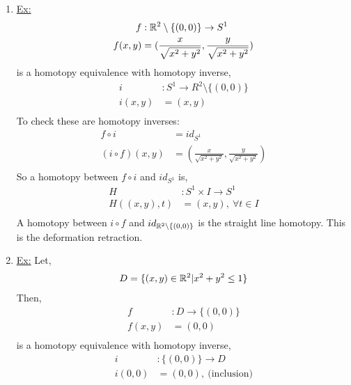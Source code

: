     \begin{enumerate}
        \item \underline{Ex:}
            \begin{align*}
                f&: \mathbb{R}^2\setminus\{(0,0)\}\rightarrow S^{1}\\
                f(x,y)&=(\frac{x}{\sqrt{x^2+y^2}},\frac{y}{\sqrt{x^2+y^2}})\\
            \end{align*}
            is a homotopy equivalence with homotopy inverse,
            \begin{align*}
                i&: S^{1}\rightarrow R^2\setminus\{(0,0)\}\\
                i(x,y)&=(x,y)\\
            \end{align*}
            To check these are homotopy inverses:
            \begin{align*}
                f\circ i &= id_{S^1}\\
                (i\circ f)(x,y)&=(\frac{x}{\sqrt{x^2+y^2}},\frac{y}{\sqrt{x^2+y^2}})\\
            \end{align*}
            So a homotopy between $f\circ i$ and $id_{S^{1}}$ is,
            \begin{align*}
                H&:S^{1}\times I\rightarrow S^{1}\\
                H((x,y),t)&=(x,y),\ \forall t\in I\\
            \end{align*}
            A homotopy between $i\circ f$ and $id_{\mathbb{R}^2\setminus\{(0,0)\}}$ is the straight line homotopy. This is
            the deformation retraction.
        \item \underline{Ex:} Let,
            \begin{align*}
                D&=\{(x,y)\in \mathbb{R}^2| x^2+y^2\leq 1\}\\
            \end{align*}
            Then,
            \begin{align*} 
                f&: D\rightarrow \{(0,0)\}\\
                f(x,y)&=(0,0)\\
            \end{align*}
            is a homotopy equivalence with homotopy inverse,
            \begin{align*}
                i&: \{(0,0)\}\rightarrow D\\
                i(0,0)&=(0,0),\ \text{(inclusion)}\\

\end{align*}
\end{enumerate}
